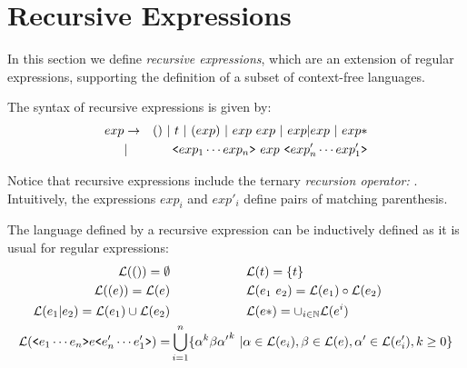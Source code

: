 \documentclass[runningheads]{llncs}
\begin{document}
\section{Recursive Expressions}
\label{sec:rec_exp}

In this section we define \emph{recursive expressions}, which are an extension of regular expressions, supporting the definition of a subset of context-free languages.

The syntax of recursive expressions is given by:
\begin{eqnarray*}
    exp &\rightarrow& () \ |\ t\ |\ ( exp )\ |\ exp~exp\ |\ exp \text{$|$} exp\ |\ exp* \\
    &|&\texttt{<}exp_1 \cdots exp_n\texttt{>}\ exp\ \texttt{<}exp'_n \cdots exp'_1\texttt{>}
\end{eqnarray*}

Notice that recursive expressions 
include the ternary \emph{recursion operator: } \rep{\_}{\_}{\_}.
Intuitively, the expressions $exp_i$ and $exp'_i$ define pairs of matching parenthesis.



The language defined by a recursive expression can be inductively defined as it is usual for regular expressions:
\begin{align*}
{\cal L}( \text{()} ) = \emptyset &\qquad\qquad\qquad
{\cal L}( t ) = \{ t \} \\
{\cal L}( \text{(}e\text{)} ) = {\cal L}( e ) &\qquad\qquad\qquad
{\cal L}( e_1\ e_2 ) = {\cal L}( e_1 ) \circ {\cal L}( e_2 )\\
{\cal L}( e_1\text{$|$} e_2 ) = {\cal L}( e_1 ) \cup {\cal L}( e_2 ) &\qquad\qquad\qquad
{\cal L}( e* ) = \cup_{i\in \mathbb{N}}{\cal L}( e^i )\\
{\cal L}(\texttt{<}e_1 \cdots e_n\texttt{>}e\texttt{<}e'_n \cdots e'_1\texttt{>}) = &\bigcup_{i=1}^{n}\{\alpha^k \beta {\alpha'}^k\ | \alpha \in {\cal L}(e_i), \beta\in {\cal L}(e), \alpha' \in {\cal L}(e'_i), k \geq 0\}
\end{align*}
\end{document}
